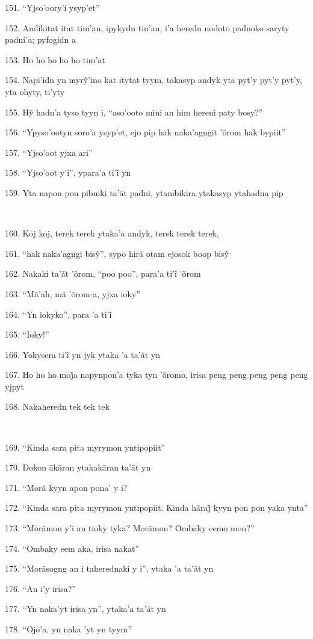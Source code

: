 151. ``Yjso'oory'i ysyp'et''

152. Andikitat itat tim'an, ipykydn tin'an, i'a heredn nodoto padnoko
saryty padni'a; pyfogidn a

153. Ho ho ho ho ho tim'at

154. Napi’idn yn myrỹ’ino kat itytat tyym, takasyp andyk yta pyt’y pyt’y pyt’y, yta ohyty, ti’yty

155. Hỹ hadn’a tyso tyyn i, ``aso’ooto mini an him hereni paty bosy?''

156. ``Ypyso'ootyn soro'a ysyp'et, ejo pip hak naka'agngit 'õrom hak
bypiit''

157. ``Yjso'oot yjxa ari''

158. ``Yjso’oot y’i'', ypara’a ti’ĩ yn

159. Yta napon pon pibmki ta'ãt padni, ytambikira ytakasyp ytahadna pip

~

160. Koj koj, terek terek ytaka'a andyk, terek terek terek,

161. ``hak naka’agngi bisỹ'', sypo hirã otam ejosok boop bisỹ

162. Nakaki ta’ãt ’õrom, ``poo poo'', para’a ti’ĩ ’õrom

163. ``Mã'ah, mã 'õrom a, yjxa ioky''

164. ``Yn iokyko'', para ’a ti’ĩ

165. ``Ioky!''

166. Yokysera ti’ĩ yn jyk ytaka ’a ta’ãt yn

167. Ho ho ho moj̃a napynpon’a tyka tyn ’õromo, irisa peng peng peng peng peng yjpyt

168. Nakaheredn tek tek tek

~

169. ``Kinda sara pita myrymon yntipopiit''

170. Dokon ãkãran ytakakãran ta'ãt yn

171. ``Morã kyyn apon pona' y i?

172. ``Kinda sara pita myrymon yntipopiit. Kinda hãraj̃ kyyn pon pon yaka ynta''

173. ``Morãmon y'i an tioky tyka? Morãmon? Ombaky eemo mon?''

174. ``Ombaky eem aka, irisa nakat''

175. ``Morãsogng an i taherednaki y i'', ytaka 'a ta'ãt yn

176. ``An i'y irisa?''

177. ``Yn naka'yt irisa yn'', ytaka'a ta'ãt yn

178. ``Ojo'a, yn naka 'yt yn tyym''

